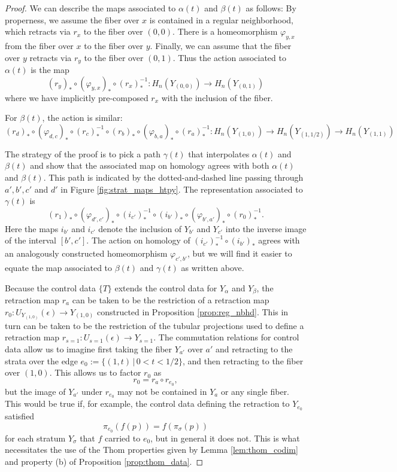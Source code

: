 \begin{proof}
	We can describe the maps associated to $\alpha(t)$ and $\beta(t)$ as follows: By properness, we assume the fiber over $x$ is contained in a regular neighborhood, which retracts via $r_x$ to the fiber over $(0,0)$. There is a homeomorphism $\varphi_{y,x}$ from the fiber over $x$ to the fiber over $y$. Finally, we can assume that the fiber over $y$ retracts via $r_y$ to the fiber over $(0,1)$. Thus the action associated to $\alpha(t)$ is the map
	\[
		(r_y)_*\circ(\varphi_{y,x})_*\circ (r_x)^{-1}_*:H_n(Y_{(0,0)})\to H_n(Y_{(0,1)})
	\]
	where we have implicitly pre-composed $r_x$ with the inclusion of the fiber.

	For $\beta(t)$, the action is similar:
	\[
		(r_d)_*\circ (\varphi_{d,c})_*\circ (r_c)_*^{-1}\circ (r_b)_*\circ (\varphi_{b,a})_*\circ (r_a)^{-1}_*: H_n(Y_{(1,0)})\to H_n(Y_{(1,1/2)}) \to H_n(Y_{(1,1)})
	\] 
	
	The strategy of the proof is to pick a path $\gamma(t)$ that interpolates $\alpha(t)$ and $\beta(t)$ and show that the associated map on homology agrees with both $\alpha(t)$ and $\beta(t)$. This path is indicated by the dotted-and-dashed line passing through $a',b',c'$ and $d'$ in Figure \ref{fig:strat_maps_htpy}. The representation associated to $\gamma(t)$ is
	\[
		(r_{1})_*\circ (\varphi_{d',c'})_*\circ (i_{c'})_*^{-1} \circ (i_{b'})_* \circ (\varphi_{b',a'})_* \circ (r_{0})^{-1}_*.
	\]
        Here the maps $i_{b'}$ and $i_{c'}$ denote the inclusion of $Y_{b'}$ and $Y_{c'}$ into the inverse image of the interval $[b',c']$. The action on homology of $(i_{c'})_*^{-1} \circ (i_{b'})_*$ agrees with an analogously constructed homeomorphism $\varphi_{c',b'}$, but we will find it easier to equate the map associated to $\beta(t)$ and $\gamma(t)$ as written above.

        Because the control data $\{T\}$ extends the control data for $Y_{\alpha}$ and $Y_{\beta}$, the retraction map $r_a$ can be taken to be the restriction of a retraction map $r_{0}:U_{Y_{(1,0)}}(\epsilon)\to Y_{(1,0)}$ constructed in Proposition \ref{prop:reg_nbhd}. This in turn can be taken to be the restriction of the tubular projections used to define a retraction map $r_{s=1}:U_{s=1}(\epsilon)\to Y_{s=1}$. The commutation relations for control data allow us to imagine first taking the fiber $Y_{a'}$ over $a'$ and retracting to the strata over the edge $e_0:=\{(1,t)\,|\, 0<t<1/2\}$, and then retracting to the fiber over $(1,0)$. This allows us to factor $r_{0}$ as
\[
r_{0}=r_{a}\circ r_{e_0},
\]
but the image of $Y_{a'}$ under $r_{e_0}$ may not be contained in $Y_{a}$ or any single fiber. This would be true if, for example, the control data defining the retraction to $Y_{e_0}$ satisfied
\[
\pi_{e_0}(f(p))=f(\pi_{\sigma}(p))
\]
for each stratum $Y_{\sigma}$ that $f$ carried to $e_0$, but in general it does not. This is what necessitates the use of the Thom properties given by Lemma \ref{lem:thom_codim} and property (b) of Proposition \ref{prop:thom_data}.


\end{proof}
